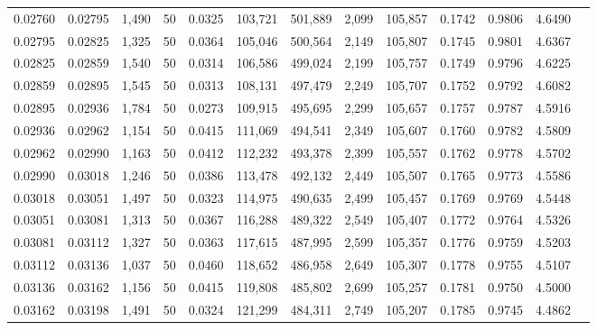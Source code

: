 \begin{tabular}{rrrrrrrrrrrrr}
0.02760 & 0.02795 & 1,490 &  50 &                                     0.0325 & 103,721 & 501,889 &   2,099 & 105,857 & 0.1742 & 0.9806 & 4.6490 \\
0.02795 & 0.02825 & 1,325 &  50 &                                     0.0364 & 105,046 & 500,564 &   2,149 & 105,807 & 0.1745 & 0.9801 & 4.6367 \\
0.02825 & 0.02859 & 1,540 &  50 &                                     0.0314 & 106,586 & 499,024 &   2,199 & 105,757 & 0.1749 & 0.9796 & 4.6225 \\
0.02859 & 0.02895 & 1,545 &  50 &                                     0.0313 & 108,131 & 497,479 &   2,249 & 105,707 & 0.1752 & 0.9792 & 4.6082 \\
0.02895 & 0.02936 & 1,784 &  50 &                                     0.0273 & 109,915 & 495,695 &   2,299 & 105,657 & 0.1757 & 0.9787 & 4.5916 \\
0.02936 & 0.02962 & 1,154 &  50 &                                     0.0415 & 111,069 & 494,541 &   2,349 & 105,607 & 0.1760 & 0.9782 & 4.5809 \\
0.02962 & 0.02990 & 1,163 &  50 &                                     0.0412 & 112,232 & 493,378 &   2,399 & 105,557 & 0.1762 & 0.9778 & 4.5702 \\
0.02990 & 0.03018 & 1,246 &  50 &                                     0.0386 & 113,478 & 492,132 &   2,449 & 105,507 & 0.1765 & 0.9773 & 4.5586 \\
0.03018 & 0.03051 & 1,497 &  50 &                                     0.0323 & 114,975 & 490,635 &   2,499 & 105,457 & 0.1769 & 0.9769 & 4.5448 \\
0.03051 & 0.03081 & 1,313 &  50 &                                     0.0367 & 116,288 & 489,322 &   2,549 & 105,407 & 0.1772 & 0.9764 & 4.5326 \\
0.03081 & 0.03112 & 1,327 &  50 &                                     0.0363 & 117,615 & 487,995 &   2,599 & 105,357 & 0.1776 & 0.9759 & 4.5203 \\
0.03112 & 0.03136 & 1,037 &  50 &                                     0.0460 & 118,652 & 486,958 &   2,649 & 105,307 & 0.1778 & 0.9755 & 4.5107 \\
0.03136 & 0.03162 & 1,156 &  50 &                                     0.0415 & 119,808 & 485,802 &   2,699 & 105,257 & 0.1781 & 0.9750 & 4.5000 \\
0.03162 & 0.03198 & 1,491 &  50 &                                     0.0324 & 121,299 & 484,311 &   2,749 & 105,207 & 0.1785 & 0.9745 & 4.4862 \\

\end{tabular}
